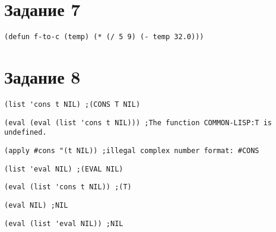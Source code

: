 \section{Задание 7}
\begin{center}
	\begin{lstlisting}[label=a7, caption={Выражение 1}]
(defun f-to-c (temp) (* (/ 5 9) (- temp 32.0)))
	\end{lstlisting}
\end{center}
\section{Задание 8}
\begin{center}
	\begin{lstlisting}[label=a8, caption={Выражение 1}]
	(list 'cons t NIL) ;(CONS T NIL)
	\end{lstlisting}
	\begin{lstlisting}[label=b8, caption={Выражение 2}]
	(eval (eval (list 'cons t NIL))) ;The function COMMON-LISP:T is undefined.
	\end{lstlisting}
	\begin{lstlisting}[label=c8, caption={Выражение 3}]
	(apply #cons "(t NIL)) ;illegal complex number format: #CONS
	\end{lstlisting}
	\begin{lstlisting}[label=d8, caption={Выражение 4}]
	(list 'eval NIL) ;(EVAL NIL)
	\end{lstlisting}
	\begin{lstlisting}[label=e8, caption={Выражение 5}]
	(eval (list 'cons t NIL)) ;(T)
	\end{lstlisting}
	\begin{lstlisting}[label=f8, caption={Выражение 6}]
	(eval NIL) ;NIL
	\end{lstlisting}
	\begin{lstlisting}[label=g8, caption={Выражение 7}]
	(eval (list 'eval NIL)) ;NIL
	\end{lstlisting}
\end{center}